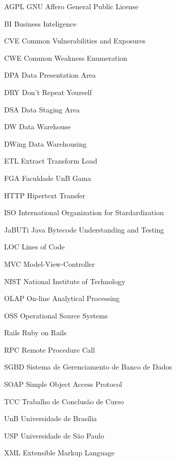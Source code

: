 \begin{siglas}
  
  \item[AGPL] GNU Affero General Public License
  \item[BI] Business Inteligence
  \item[CVE] Common Vulnerabilities and Exposures
  \item[CWE] Common Weakness Enumeration
  \item[DPA] Data Presentation Area
  \item[DRY] Don't Repeat Yourself
  \item[DSA] Data Staging Area
  \item[DW] Data Warehouse
  \item[DWing] Data Warehousing
  \item[ETL] Extract Transform Load
  \item[FGA] Faculdade UnB Gama
  \item[HTTP] Hipertext Transfer
  \item[ISO] International Organization for Stardardization
  \item[JaBUTi] Java Bytecode Understanding and Testing
  \item[LOC] Lines of Code
  \item[MVC] Model-View-Controller
  \item[NIST] National Institute of Technology
  \item[OLAP] On-line Analytical Processing
  \item[OSS] Operational Source Systems
  \item[Rails] Ruby on Rails
  \item[RPC] Remote Procedure Call
  \item[SGBD] Sistema de Gerenciamento de Banco de Dados
  \item[SOAP] Simple Object Access Protocol
  \item[TCC] Trabalho de Conclusão de Curso
  \item[UnB] Universidade de Brasília
  \item[USP] Universidade de São Paulo
  \item[XML] Extensible Markup Language
  


  
\end{siglas}
